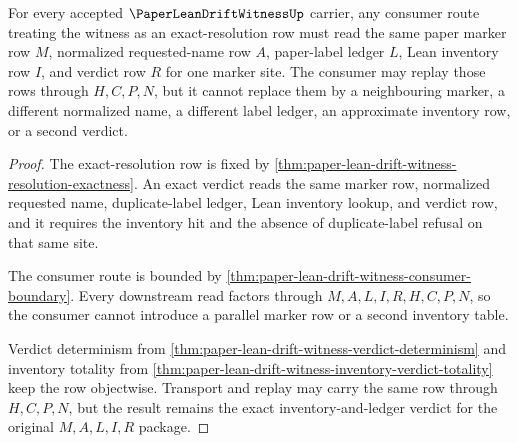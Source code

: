 \begin{theorem}
\label{thm:paper-lean-drift-witness-resolution-consumer-readiness}
For every accepted $\PaperLeanDriftWitnessUp$ carrier, any consumer route treating the witness as an exact-resolution row must read the same paper marker row $M$, normalized requested-name row $A$, paper-label ledger $L$, Lean inventory row $I$, and verdict row $R$ for one marker site. The consumer may replay those rows through $H,C,P,N$, but it cannot replace them by a neighbouring marker, a different normalized name, a different label ledger, an approximate inventory row, or a second verdict.
\end{theorem}
\begin{proof}
The exact-resolution row is fixed by \autoref{thm:paper-lean-drift-witness-resolution-exactness}. An exact verdict reads the same marker row, normalized requested name, duplicate-label ledger, Lean inventory lookup, and verdict row, and it requires the inventory hit and the absence of duplicate-label refusal on that same site.

The consumer route is bounded by \autoref{thm:paper-lean-drift-witness-consumer-boundary}. Every downstream read factors through $M,A,L,I,R,H,C,P,N$, so the consumer cannot introduce a parallel marker row or a second inventory table.

Verdict determinism from \autoref{thm:paper-lean-drift-witness-verdict-determinism} and inventory totality from \autoref{thm:paper-lean-drift-witness-inventory-verdict-totality} keep the row objectwise. Transport and replay may carry the same row through $H,C,P,N$, but the result remains the exact inventory-and-ledger verdict for the original $M,A,L,I,R$ package.
\end{proof}

